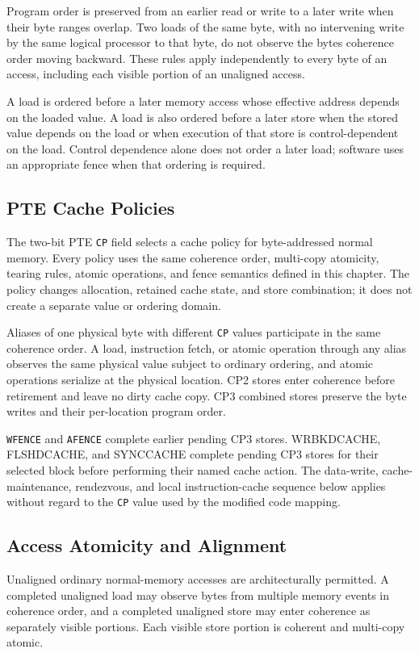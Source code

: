 Program order is preserved from an earlier read or write to a later write when their byte ranges overlap. Two loads
of the same byte, with no intervening write by the same logical processor to that byte, do not observe the byte\textquotesingle{}s coherence order moving
backward. These rules apply independently to every byte of an access, including each visible portion of an unaligned
access.

A load is ordered before a later memory access whose effective address depends on the loaded value. A load is also
ordered before a later store when the stored value depends on the load or when execution of that store is
control-dependent on the load. Control dependence alone does not order a later load; software uses an appropriate
fence when that ordering is required.

\subsection{PTE Cache Policies}
The two-bit PTE \texttt{CP} field selects a cache policy for byte-addressed normal memory. Every policy uses the
same coherence order, multi-copy atomicity, tearing rules, atomic operations, and fence semantics defined in this
chapter. The policy changes allocation, retained cache state, and store combination; it does not create a separate
value or ordering domain.



Aliases of one physical byte with different \texttt{CP} values participate in the same coherence order. A load,
instruction fetch, or atomic operation through any alias observes the same physical value subject to ordinary
ordering, and atomic operations serialize at the physical location. CP2 stores enter coherence before retirement
and leave no dirty cache copy. CP3 combined stores preserve the byte writes and their per-location program order.

\texttt{WFENCE} and \texttt{AFENCE} complete earlier pending CP3 stores. WRBKDCACHE, FLSHDCACHE, and SYNCCACHE
complete pending CP3 stores for their selected block before performing their named cache action. The
data-write, cache-maintenance, rendezvous, and local instruction-cache sequence below applies without regard to the
\texttt{CP} value used by the modified code mapping.

\subsection{Access Atomicity and Alignment}
Unaligned ordinary normal-memory accesses are architecturally permitted. A completed unaligned load may observe bytes from
multiple memory events in coherence order, and a completed unaligned store may enter coherence as separately visible portions. Each
visible store portion is coherent and multi-copy atomic.

